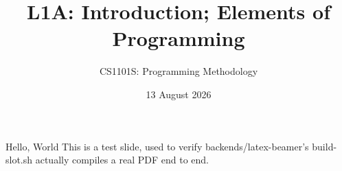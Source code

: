 \title{L1A: Introduction; Elements of Programming}
\author{CS1101S: Programming Methodology}
\date{13 August 2026}



\begin{frame}
\titlepage
\end{frame}

\begin{frame}{Hello, World}
This is a test slide, used to verify backends/latex-beamer's build-slot.sh
actually compiles a real PDF end to end.
\end{frame}


